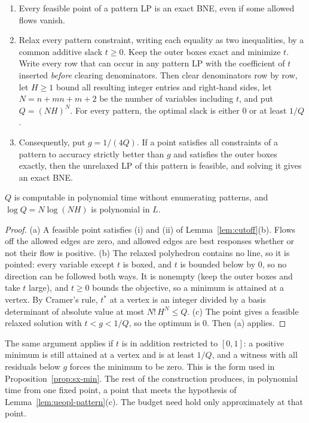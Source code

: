 \begin{lemma}\label{lem:ueopl-pattern}
\statusrefereed
\begin{enumerate}[label=(\alph*),nosep]
  \item Every feasible point of a pattern LP is an exact BNE, even if some allowed flows vanish.
  \item Relax every pattern constraint, writing each equality as two inequalities, by a common
        additive slack $t\ge0$. Keep the outer boxes exact and minimize $t$. Write every row that can
        occur in any pattern LP with the coefficient of $t$ inserted \emph{before} clearing
        denominators. Then clear denominators row by row, let $H\ge1$ bound all resulting integer
        entries and right-hand sides, let $N=n+mn+m+2$ be the number of variables including $t$, and
        put $Q=(NH)^N$. For every pattern, the optimal slack is either $0$ or at least $1/Q$.
  \item Consequently, put $g=1/(4Q)$. If a point satisfies all constraints of a pattern to accuracy
        strictly better than $g$ and satisfies the outer boxes exactly, then the unrelaxed LP of
        this pattern is feasible, and solving it gives an exact BNE.
\end{enumerate}
$Q$ is computable in polynomial time without enumerating patterns, and $\log Q=N\log(NH)$ is
polynomial in $L$.
\end{lemma}

\begin{proof}
(a) A feasible point satisfies (i) and (ii) of Lemma~\ref{lem:cutoff}(b). Flows off the allowed
edges are zero, and allowed edges are best responses whether or not their flow is positive.
(b) The relaxed polyhedron contains no line, so it is pointed: every variable except $t$ is boxed, and
$t$ is bounded below by $0$, so no direction can be followed both ways. It is nonempty (keep the outer
boxes and take $t$ large), and $t\ge0$ bounds the objective, so a minimum is attained at a vertex. By Cramer's rule, $t^*$ at a vertex is an integer divided by a basis determinant
of absolute value at most $N!\,H^N\le Q$. (c) The point gives a feasible relaxed solution with
$t<g<1/Q$, so the optimum is $0$. Then (a) applies.
\end{proof}

The same argument applies if $t$ is in addition restricted to $[0,1]$: a positive minimum is still
attained at a vertex and is at least $1/Q$, and a witness with all residuals below $g$ forces the minimum
to be zero. This is the form used in Proposition~\ref{prop:sx-min}. The rest of the construction
produces, in polynomial time from one fixed point, a point that meets the hypothesis of
Lemma~\ref{lem:ueopl-pattern}(c). The budget need hold only approximately at that point.

